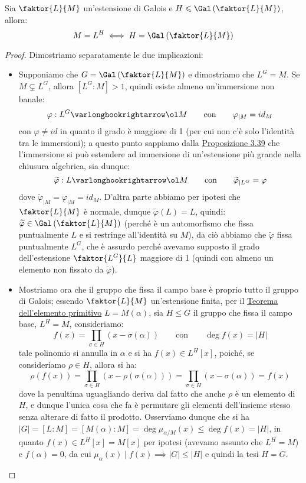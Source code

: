 \documentclass[11pt]{scrartcl}
\begin{document}
\begin{lemma}
    \label{3.66}
    Sia $\faktor{L}{M}$ un'estensione di Galois e $H \leqslant \Gal\left(\faktor{L}{M}\right)$, allora:
    \[ M = L^H \iff H = \Gal\left(\faktor{L}{M}\right)
        \]
\end{lemma}

\begin{proof}
    Dimostriamo separatamente le due implicazioni:
    \begin{itemize}
        \item Supponiamo che $G = \Gal\left(\faktor{L}{M}\right)$ e dimostriamo che $L^G = M$. Se $M \subsetneq L^G$, allora $[L^G : M]>1$, quindi esiste almeno un'immersione non banale:
        \[ \varphi : L^G \varlonghookrightarrow \ol M \qquad \text{con} \qquad \varphi_{|M} = id_M
            \]
        con $\varphi \ne id$ in quanto il grado è maggiore di 1 (per cui non c'è solo l'identità tra le immersioni); a questo punto sappiamo dalla \hyperref[3.39]{Proposizione 3.39} che l'immersione si può estendere ad 
        immersione di un'estensione più grande nella chiusura algebrica, sia dunque:
        \[ \widetilde{\varphi} : L \varlonghookrightarrow \ol M \qquad \text{con} \qquad \widetilde{\varphi}_{|L^G} = \varphi
            \]
        dove $\widetilde{\varphi}_{|M} = \varphi_{|M} = id_M$. D'altra parte abbiamo per ipotesi che $\faktor{L}{M}$ è normale, dunque $\widetilde{\varphi}(L) = L$, quindi:
        $\widetilde{\varphi} \in \Gal\left(\faktor{L}{M}\right)$ (perché è un automorfismo che fissa puntualmente $L$ e si restringe all'identità su $M$), da ciò abbiamo che $\widetilde{\varphi}$ fissa puntualmente
        $L^G$, che è assurdo perché avevamo supposto il grado dell'estensione $\faktor{L^G}{L}$ maggiore di 1 (quindi con almeno un elemento non fissato da $\widetilde{\varphi}$).
        \item Mostriamo ora che il gruppo che fissa il campo base è proprio tutto il gruppo di Galois; essendo $\faktor{L}{M}$ un'estensione finita, per il \hyperref[prim]{Teorema dell'elemento primitivo} $L = M(\alpha)$, sia $H \leqslant G$ il gruppo che fissa il campo base, $L^H = M$, consideriamo:
        \[ f(x) = \prod_{\sigma \in H}(x - \sigma(\alpha)) \qquad \text{con} \qquad \deg f(x) = |H|
            \]
        tale polinomio si annulla in $\alpha$ e si ha $f(x) \in L^H[x]$, poiché, se consideriamo $\rho \in H$, allora si ha:
        \[ \rho (f(x)) = \prod_{\sigma \in H}(x - \rho(\sigma(\alpha))) = \prod_{\sigma \in H}(x - \sigma(\alpha)) = f(x)
            \]
        dove la penultima uguagliando deriva dal fatto che anche $\rho$ è un elemento di $H$, e dunque l'unica cosa che fa è permutare gli elementi dell'insieme stesso senza alterare di fatto il prodotto.
        Osserviamo dunque che si ha $|G| = [L : M] = [M(\alpha) : M] = \deg \mu_{\alpha/M}(x) \leq \deg f(x) = |H|$, in quanto $f(x) \in L^H[x] = M[x]$ per ipotesi (avevamo assunto che $L^H = M$) e $f(\alpha) = 0$, da cui $\mu_\alpha(x) \mid f(x) \implies |G| \leq |H|$ e quindi la tesi $H = G$.
    \end{itemize}
\end{proof}
\end{document}
